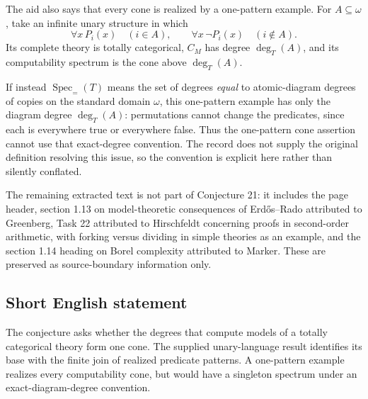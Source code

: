 \documentclass[11pt]{article}
\begin{document}
The aid also says that every cone is realized by a one-pattern example. For \(A\subseteq\omega\), take an infinite unary structure in which
\[
 \forall x\,P_i(x)\quad(i\in A),\qquad
 \forall x\,\neg P_i(x)\quad(i\notin A).
\]
Its complete theory is totally categorical, \(C_M\) has degree \(\deg_T(A)\), and its computability spectrum is the cone above \(\deg_T(A)\).

If instead \(\operatorname{Spec}_{=}(T)\) means the set of degrees \emph{equal} to atomic-diagram degrees of copies on the standard domain \(\omega\), this one-pattern example has only the diagram degree \(\deg_T(A)\): permutations cannot change the predicates, since each is everywhere true or everywhere false. Thus the one-pattern cone assertion cannot use that exact-degree convention. The record does not supply the original definition resolving this issue, so the convention is explicit here rather than silently conflated.

The remaining extracted text is not part of Conjecture 21: it includes the page header, section 1.13 on model-theoretic consequences of Erd\H{o}s--Rado attributed to Greenberg, Task 22 attributed to Hirschfeldt concerning proofs in second-order arithmetic, with forking versus dividing in simple theories as an example, and the section 1.14 heading on Borel complexity attributed to Marker. These are preserved as source-boundary information only.
\subsection{Short English statement}
The conjecture asks whether the degrees that compute models of a totally categorical theory form one cone. The supplied unary-language result identifies its base with the finite join of realized predicate patterns. A one-pattern example realizes every computability cone, but would have a singleton spectrum under an exact-diagram-degree convention.
\end{document}
